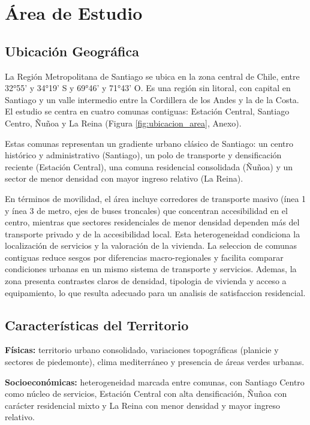 \documentclass[11pt,letterpaper]{article}
\begin{document}
\section{Área de Estudio}

\subsection{Ubicación Geográfica}
La Región Metropolitana de Santiago se ubica en la zona central de Chile, entre 32°55' y 34°19' S y 69°46' y 71°43' O. Es una región sin litoral, con capital en Santiago y un valle intermedio entre la Cordillera de los Andes y la de la Costa. El estudio se centra en cuatro comunas contiguas: Estación Central, Santiago Centro, Ñuñoa y La Reina (Figura \ref{fig:ubicacion_area}, Anexo).

Estas comunas representan un gradiente urbano clásico de Santiago: un centro histórico y administrativo (Santiago), un polo de transporte y densificación reciente (Estación Central), una comuna residencial consolidada (Ñuñoa) y un sector de menor densidad con mayor ingreso relativo (La Reina).

En términos de movilidad, el área incluye corredores de transporte masivo (ínea 1 y ínea 3 de metro, ejes de buses troncales) que concentran accesibilidad en el centro, mientras que sectores residenciales de menor densidad dependen más del transporte privado y de la accesibilidad local. Esta heterogeneidad condiciona la localización de servicios y la valoración de la vivienda.
La seleccion de comunas contiguas reduce sesgos por diferencias macro-regionales y facilita comparar condiciones urbanas en un mismo sistema de transporte y servicios. Ademas, la zona presenta contrastes claros de densidad, tipologia de vivienda y acceso a equipamiento, lo que resulta adecuado para un analisis de satisfaccion residencial.

\subsection{Características del Territorio}
\textbf{Físicas:} territorio urbano consolidado, variaciones topográficas (planicie y sectores de piedemonte), clima mediterráneo y presencia de áreas verdes urbanas.

\textbf{Socioeconómicas:} heterogeneidad marcada entre comunas, con Santiago Centro como núcleo de servicios, Estación Central con alta densificación, Ñuñoa con carácter residencial mixto y La Reina con menor densidad y mayor ingreso relativo.
\end{document}

